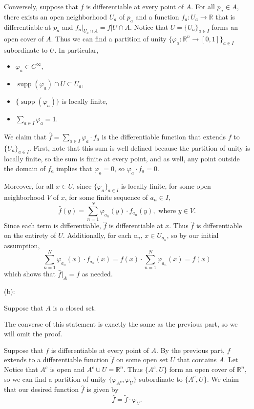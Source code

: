 \documentclass{article}
\theoremstyle{plain} %
\numberwithin{thm}{section} %
\theoremstyle{definition}
\begin{document}
\begin{question}{36}

        Conversely, suppose that \(f\) is differentiable at every point of \(A\). For all \(p_a \in A\), there exists an open neighborhood \(U_a\) of \(p_a\) and a function \(f_a : U_a \to \mathbb{R}\) that is differentiable at \(p_a\) and \(f_a \vert _{U_a \cap A} = f \vert U \cap A\). Notice that \(U = \{U_a\}_{a \in I}\) forms an open cover of \(A\). Thus we can find a partition of unity \(\{ \varphi _a : \mathbb{R}^n \to [0,1]\}_{a\in I}\) subordinate to \(U\). In particular,
        \begin{itemize}
            \item \(\varphi _a \in C^{\infty}\),
            \item \(\mathop{\mathrm{supp}}(\varphi _a)\cap U \subseteq U_a\),
            \item \(\{\mathop{\mathrm{supp}}(\varphi_a)\}\) is locally finite,
            \item \(\sum\limits_{a \in I} \varphi _a = 1\).
        \end{itemize}
        We claim that \(\hat{f} = \sum_{a \in I} \varphi _a \cdot f_a\) is the differentiable function that extends \(f\) to \(\{ U_a \} _{a \in I}\). First, note that this sum is well defined because the partition of unity is locally finite, so the sum is finite at every point, and as well, any point outside the domain of \(f_a\) implies that \(\varphi _a = 0\), so \(\varphi _a \cdot f_a = 0\).

        Moreover, for all \(x \in U\), since \(\{ \varphi _a \}_{a \in I}\) is locally finite, for some open neighborhood \(V\) of \(x\), for some finite sequence of \(a_n \in I\),
        \[
            \hat{f}(y) = \sum_{n=1}^{N} \varphi _{a_n} (y) \cdot f_{a_n}(y), \text{ where } y \in V.
        \]
        Since each term is differentiable, \(\hat{f}\) is differentiable at \(x\). Thus \(\hat{f}\) is differentiable on the entirety of \(U\). Additionally, for each \(a_n\), \(x \in U_{a_n}\), so by our initial assumption,
        \[
            \sum_{n=1}^{N} \varphi _{a_n} (x) \cdot f_{a_n}(x) = f(x) \cdot \sum_{n=1}^{N} \varphi _{a_n} (x) = f(x)
        \]
        which shows that \(\hat{f}\vert _A = f\) as needed.

        \medskip

        (b):

        Suppose that \(A\) is a closed set.

        The converse of this statement is exactly the same as the previous part, so we will omit the proof.

        Suppose that \(f\) is differentiable at every point of \(A\). By the previous part, \(f\) extends to a differentiable function \(\widetilde{f}\) on some open set \(U\) that contains \(A\). Let Notice that \(A^c\) is open and \(A^c \cup U = \mathbb{R}^n\). Thus \(\{ A^c, U \}\) form an open cover of \(\mathbb{R}^n\), so we can find a partition of unity \(\{\varphi_{A^c}, \varphi_{U}\}\) subordinate to \(\{ A^c, U \}\). We claim that our desired function \(\widehat{f}\) is given by
        \[
            \widehat{f} = \widetilde{f} \cdot \varphi_{U}.
        \]
 \end{question}
\end{document}
